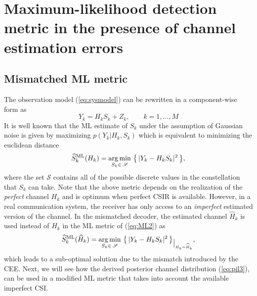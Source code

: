 \documentclass{article}
\def\Hh{{\widehat H}}
\begin{document}
\section{Maximum-likelihood detection metric in the presence of channel estimation errors}
\label{sec:MLmetric}
\subsection{Mismatched ML metric}
The observation model (\ref{eq:sysmodel}) can be rewritten in a component-wise form as
\begin{equation}
\label{eq:ML1}
            Y_k = H_k S_k + Z_k, \quad \quad k=1,\ldots,M
\end{equation}
It is well known that the ML estimate of $S_k$ under the assumption of Gaussian noise is given by maximizing $p(Y_k|H_k,S_k)$ which is equivalent to minimizing the euclidean distance
\begin{equation}
\label{eq:ML2}
            {\widehat{S}}^{\mathrm{ML}}_k(H_k) =\mathop{\mathrm{arg\,min}}_{S_k \in \, {\mathscr{S}}}\, \big \{\,|Y_k - H_k S_k|^2 \, \big \},
\end{equation} 
where the set $\mathscr{S}$ contains all of the possible discrete values in the constellation that $S_k$ can take.   
Note that the above metric depends on the realization of the {\it perfect} channel $H_k$ and is optimum when perfect CSIR is available. However, in a real communication system, the receiver has only access to an {\it imperfect} estimated version of the channel. In the mismatched decoder, the estimated channel $\widehat{H}_k$ is used instead of $H_k$ in the ML metric of (\ref{eq:ML2}) as 
\begin{equation}
\label{eq:ML3}
            {\widehat{S}}^{\mathrm{ML}}_k(\Hh_k) =\argmin_{S_k \in \, {\mathscr{S}}}\, \big \{\,|Y_k - H_k S_k|^2 \, \big \}_{{\big |_{H_k=\Hh_k}}},
\end{equation} 
which leads to a sub-optimal solution due to the mismatch introduced by the CEE. Next, we will see how the derived posterior channel distribution (\ref{eq:pil3}), can be used in a modified ML metric that takes into account the available imperfect CSI.    
\end{document}
